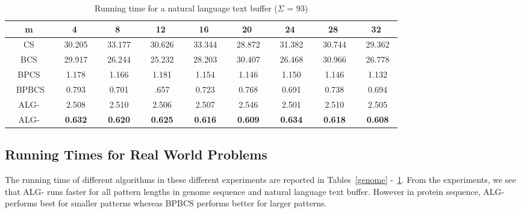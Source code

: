 \documentclass{llncs}
\newcommand{\rom}[1]{\uppercase\expandafter{\romannumeral #1\relax}}
\begin{document}
{\begin{table}
\begin{center}
\begin{tabular}{|c|c|c|c|c|c|c|c|c|}
\hline
m&4&8&12&16&20&24&28&32\\
\hline
CS &~ 30.205~ &~ 33.177~ &~ 30.626~ &~ 33.344~ &~ 28.872~ &~ 31.382~ &~ 30.744~ &~ 29.362~ \\
\hline
BCS &~ 29.917~ &~ 26.244~ &~ 25.232~ &~ 28.203~ &~ 30.407~ &~ 26.468~ &~ 30.966~ &~ 26.778~ \\
\hline
BPCS &~ 1.178~ &~ 1.166~ &~ 1.181~ &~ 1.154~ &~ 1.146~ &~ 1.150~ &~ 1.146~ &~ 1.132~ \\
\hline
~ BPBCS~ &~ 0.793~ &~ 0.701~ &~ .657~ &~ 0.723~ &~ 0.768~ &~ 0.691~ &~ 0.738~ &~ 0.694~ \\
\hline
ALG-\rom{2} &~ 2.508~ &~ 2.510~ &~ 2.506~ &~ 2.507~ &~ 2.546~ &~ 2.501~ &~ 2.510~ &~ 2.505~ \\
\hline
ALG-\rom{1} &~ \textbf{0.632}~ &~ \textbf{0.620}~ &~ \textbf{0.625}~ &~ \textbf{0.616}~ &~ \textbf{0.609}~ &~ \textbf{0.634}~ &~ \textbf{0.618}~ &~ \textbf{0.608}~ \\
\hline
\end{tabular}
\caption{Running time for a natural language text buffer ($\Sigma$ = $93$)} \label{natural}
\end{center}
\end{table}




\subsection{Running Times for Real World Problems}

The running time of different algorithms in these different experiments are reported in Tables~\ref{genome} -~\ref{natural}. From the experiments, we see that ALG-\rom{1} runs faster for all pattern lengths in genome sequence and natural language text buffer. However in protein sequence, ALG-\rom{1} performs best for smaller patterns whereas BPBCS performs better for larger patterns.  














}
\end{document}
